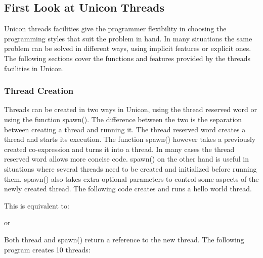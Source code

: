 \subsection[First Look at Unicon Threads]{First Look at Unicon Threads}

Unicon threads facilities give the programmer flexibility in choosing
the programming styles that suit the problem in hand. In many
situations the same problem can be solved in different ways, using
implicit features or explicit ones. The following sections cover the
functions and features provided by the threads facilities in Unicon.

\subsubsection{Thread Creation}

Threads can be created in two ways in Unicon, using the
\textsf{thread} reserved word or using the function
\textsf{spawn()}. The difference between the two is the
separation between creating a thread and running it. The thread
reserved word creates a thread and starts its execution. The function
\textsf{spawn()} however takes a previously created
co-expression and turns it into a thread. In many cases the thread
reserved word allows more concise code. \textsf{spawn()} on
the other hand is useful in situations where several threads need to be
created and initialized before running them.
\textsf{spawn()} also takes extra optional parameters
to control some aspects of the newly created thread. The following code
creates and runs a hello world thread.


\noindent This is equivalent to:


\noindent or


Both thread and \textsf{spawn()} return a reference to the
new thread. The following program creates 10 threads: 



